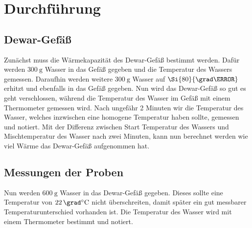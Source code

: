 \section{Durchführung}
\label{sec:Durchführung}

\subsection{Dewar-Gefäß}
Zunächst muss die Wärmekapazität des Dewar-Gefäß bestimmt werden.
Dafür werden $\SI{300}{\gram}$ Wasser in das Gefäß gegeben und die Temperatur des Wassers gemessen.
Daraufhin werden weitere $\SI{300}{\gram}$ Wasser auf $\Si{80}{\grad\celsius}$ erhitzt und ebenfalls in das Gefäß gegeben.
Nun wird das Dewar-Gefäß so gut es geht verschlossen, während die Temperatur des Wasser im Gefäß mit einem Thermometer gemessen wird.
Nach ungefähr 2 Minuten wir die Temperatur des Wasser, welches inzwischen eine homogene Temperatur haben sollte, gemessen und notiert.
Mit der Differenz zwischen Start Temperatur des Wassers und Mischtemperatur des Wasser nach zwei Minuten, kann nun berechnet werden wie viel Wärme das Dewar-Gefäß aufgenommen hat.

\subsection{Messungen der Proben}
Nun werden $\SI{600}{\gram}$ Wasser in das Dewar-Gefäß gegeben.
Dieses sollte eine Temperatur von $\SI{22}{\grad\celsius}$ nicht überschreiten, damit später ein gut messbarer Temperaturunterschied vorhanden ist.
Die Temperatur des Wasser wird mit einem Thermometer bestimmt und notiert.
